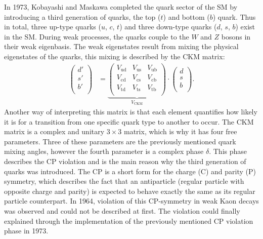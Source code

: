 In 1973, Kobayashi and Maskawa \cite{CKM_paper} completed the quark sector of the SM by introducing a third generation of quarks, the top ($t$) and bottom ($b$) quark.
Thus in total, three up-type quarks ($u$, $c$, $t$) and three down-type quarks ($d$, $s$, $b$) exist in the SM. During weak processes, the quarks couple to the
$W$ and $Z$ bosons in their weak eigenbasis. The weak eigenstates result from mixing the physical eigenstates of the quarks, this mixing is described
by the CKM matrix:
\begin{align*}
    \begin{pmatrix}
        d' \\
        s' \\
        b' \\
    \end{pmatrix}
    &=
    \underbrace{
    \begin{pmatrix}
        V_{\text{ud}} & V_{\text{us}} & V_{\text{ub}} \\
        V_{\text{cd}} & V_{\text{cs}} & V_{\text{cb}} \\
        V_{\text{td}} & V_{\text{ts}} & V_{\text{tb}} \\
    \end{pmatrix}
    }_{V_{\text{CKM}}}
    \cdot
    \begin{pmatrix}
        d \\
        s \\
        b \\
    \end{pmatrix}   . 
\end{align*}
Another way of interpreting this matrix is that each element quantifies how likely it is for a transition from one specific quark type to another to occur.
The CKM matrix is a complex and unitary $3 \times 3$ matrix, which is why it has four free parameters. Three of these parameters are the previously
mentioned quark mixing angles, however the fourth parameter is a complex phase $\delta$. This phase describes the CP violation and is the main reason why the third
generation of quarks was introduced. The CP is a short form for the charge (C) and parity (P) symmetry, which describes the fact that an antiparticle (regular particle
with opposite charge and parity) is expected to behave exactly the same as its regular particle counterpart. In 1964, violation of this CP-symmetry in weak Kaon decays was
observed and could not be described at first. The violation could finally explained through the implementation of the previously mentioned CP violation phase in 1973.

